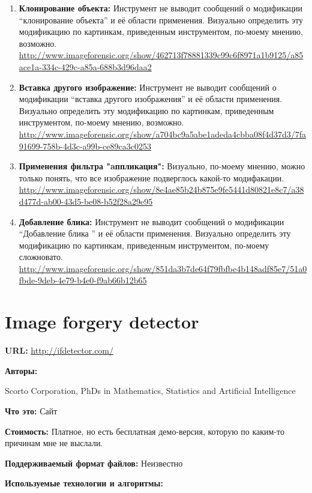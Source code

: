 \begin{enumerate}
\item \textbf{Клонирование объекта:}
Инструмент не выводит сообщений о модификации “клонирование объекта” и её области применения. Визуально определить эту модификацию по картинкам, приведенным инструментом, по-моему мнению, возможно.
\url{http://www.imageforensic.org/show/462713f78881339c99c6f8971a1b9125/a85ace1a-334c-429c-a85a-688b3d96daa2}

\item \textbf{Вставка другого изображение:}
Инструмент не выводит сообщений о модификации “вставка другого изображения” и её области применения. Визуально определить эту модификацию по картинкам, приведенным инструментом, по-моему мнению, возможно.
\url{http://www.imageforensic.org/show/a704bc9a5abe1adeda4cbba08f4d37d3/7fa91699-758b-4d3c-a99b-ce89ca3c0253}

\item \textbf{Применения фильтра "aппликация":}
Визуально, по-моему мнению, можно только понять, что все изображение подверглось какой-то модифакации. 
\url{http://www.imageforensic.org/show/8e4ae85b24b875e9fe5441d80821e8c7/a38d477d-ab00-43d5-be08-b52f28a29e95}

\item \textbf{Добавление блика:}
Инструмент не выводит сообщений о модификации “Добавление блика ” и её области применения. Визуально определить эту модификацию по картинкам, приведенным инструментом, по-моему сложновато.
\url{http://www.imageforensic.org/show/851da3b7de64f79fbfbe4b148adf85e7/51a0fbde-9deb-4e79-b4e0-f9ab66b12b65}

\end{enumerate}

\newpage

\section{Image forgery detector}

\textbf{URL: } \url{http://ifdetector.com/}

\textbf{Авторы:}

Scorto Corporation, PhDs in Mathematics, Statistics and Artificial Intelligence

\textbf{Что это:} Сайт

\textbf{Стоимость:} Платное, но есть бесплатная демо-версия, которую по каким-то причинам мне не выслали.

\textbf{Поддерживаемый формат файлов:} Неизвестно

\textbf{Используемые технологии и алгоритмы:}

